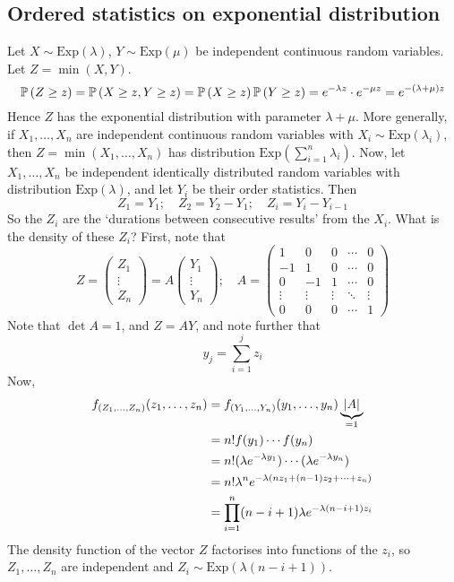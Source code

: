 \subsection{Ordered statistics on exponential distribution}
Let \(X \sim \mathrm{Exp}(\lambda)\), \(Y \sim \mathrm{Exp}(\mu)\) be independent continuous random variables.
Let \(Z = \min(X, Y)\).
\[
	\mathbb{P}\left({Z \geq z}\right) = \mathbb{P}\left({X \geq z, Y \geq z}\right) = \mathbb{P}\left({X \geq z}\right) \mathbb{P}\left({Y \geq z}\right) = e^{-\lambda z} \cdot e^{-\mu z} = e^{-(\lambda + \mu)z}
\]
Hence \(Z\) has the exponential distribution with parameter \(\lambda+\mu\).
More generally, if \(X_1, \dots, X_n\) are independent continuous random variables with \(X_i \sim \mathrm{Exp}(\lambda_i)\), then \(Z = \min(X_1, \dots, X_n)\) has distribution \(\mathrm{Exp}\left( \sum_{i=1}^n \lambda_i \right)\).
Now, let \(X_1, \dots, X_n\) be independent identically distributed random variables with distribution \(\mathrm{Exp}(\lambda)\), and let \(Y_i\) be their order statistics.
Then
\[
	Z_1 = Y_1;\quad Z_2 = Y_2 - Y_1;\quad Z_i = Y_i - Y_{i-1}
\]
So the \(Z_i\) are the `durations between consecutive results' from the \(X_i\).
What is the density of these \(Z_i\)?
First, note that
\[
	Z = \begin{pmatrix}
		Z_1 \\ \vdots \\ Z_n
	\end{pmatrix} = A \begin{pmatrix}
		Y_1 \\ \vdots \\ Y_n
	\end{pmatrix};\quad A = \begin{pmatrix}
		1      & 0      & 0      & \cdots & 0      \\
		-1     & 1      & 0      & \cdots & 0      \\
		0      & -1     & 1      & \cdots & 0      \\
		\vdots & \vdots & \vdots & \ddots & \vdots \\
		0      & 0      & 0      & \cdots & 1
	\end{pmatrix}
\]
Note that \(\det A = 1\), and \(Z = AY\), and note further that
\[
	y_j = \sum_{i=1}^j z_i
\]
Now,
\begin{align*}
	f_{(Z_1, \dots, Z_n)}(z_1, \dots, z_n) & = f_{(Y_1, \dots, Y_n)}(y_1, \dots, y_n) \underbrace{\abs{A}}_{=1} \\
	                                       & = n!
	f(y_1) \cdots f(y_n)                                                                                        \\
	                                       & = n!
	(\lambda e^{-\lambda y_1}) \cdots (\lambda e^{-\lambda y_n})                                                \\
	                                       & = n!
	\lambda^n e^{-\lambda(nz_1 + (n-1)z_2 + \dots + z_n)}                                                       \\
	                                       & = \prod_{i=1}^n (n-i+1) \lambda e^{-\lambda (n-i+1)z_i}
\end{align*}
The density function of the vector \(Z\) factorises into functions of the \(z_i\), so \(Z_1, \dots, Z_n\) are independent and \(Z_i \sim \mathrm{Exp}(\lambda(n-i+1))\).
